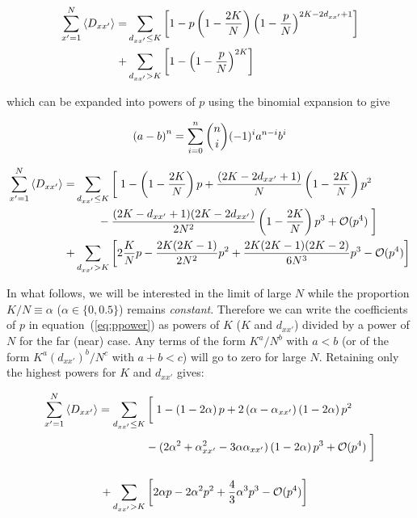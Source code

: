 \begin{align}
    \sum_{x'=1}^N \left< D_{xx'} \right> = &\sum_{d_{xx'}\leq K} \left[
    1 - p\left(1-\frac{2K}{N}\right)\left(1-\frac{p}{N}\right)^{2K - 2d_{xx'} + 1} \right] \notag\\
        + &\sum_{d_{xx'}>K} \left[ 1 - \left( 1 - \frac{p}{N} \right)^{2K} \right]
\end{align}

\noindent which can be expanded into powers of $p$ using the binomial expansion to give

\begin{align}
    \left( a - b \right)^n = \sum_{i=0}^n \binom{n}{i}(-1)^ia^{n-i}b^{i} \notag
\end{align}

\begin{align}
    \sum_{x'=1}^N \left< D_{xx'} \right> = &\sum_{d_{xx'}\leq K} \left[ \vphantom{\frac{2K}{N}} \right. 1 - \left( 1 - \frac{2K}{N} \right) p + \frac{\left( 2K-2d_{xx'}+1 \right)}{N} \left( 1 - \frac{2K}{N} \right) p^2 \notag\\
    &\qquad - \frac{(2K-d_{xx'}+1)(2K-2d_{xx'})}{2N^2}\left( 1 - \frac{2K}{N} \right)p^3 + \mathcal{O}(p^4) \left. \vphantom{\frac{2K}{N}} \right] \notag\\
    +&\sum_{d_{xx'}> K} \left[ 2\frac{K}{N}p - \frac{2K(2K-1)}{2N^2}p^2 + \frac{2K(2K-1)(2K-2)}{6N^3}p^3 - \mathcal{O}(p^4) \right]
    \label{eq:ppower}
\end{align}

In what follows, we will be interested in the limit of large $N$ while the proportion $K/N\equiv \alpha$ ($\alpha \in \{0, 0.5\}$)
remains \textit{constant}. Therefore we can write the coefficients of $p$ in equation~(\ref{eq:ppower}) as powers of $K$ ($K$ and
$d_{xx'}$) divided by a power of $N$ for the far (near) case. Any terms of the form $K^a/N^b$ with $a<b$ (or of the form
$K^a(d_{xx'})^b/N^c$ with $a+b<c$) will go to zero for large $N$. Retaining only the highest powers for $K$ and $d_{xx'}$ gives:

\begin{align}
    \sum_{x'=1}^N \left< D_{xx'} \right> = \sum_{d_{xx'}\leq K} &\left[ \vphantom{\frac{2K}{N}} \right. 1 - \left( 1 - 2\alpha \right) p + 2\left( \alpha-\alpha_{xx'} \right) \left( 1 - 2\alpha \right) p^2 \notag\\
    &- (2\alpha^2 + \alpha_{xx'}^2 - 3\alpha\alpha_{xx'})\left( 1 - 2\alpha \right)p^3 + \mathcal{O}(p^4) \left.  \vphantom{\frac{2K}{N}} \right] \notag\\[12pt]
    +\sum_{d_{xx'}> K} &\left[ 2\alpha p - 2\alpha^2 p^2 + \frac{4}{3}\alpha^3 p^3 - \mathcal{O}(p^4) \right]
    \label{eq:ppower2}
\end{align}

